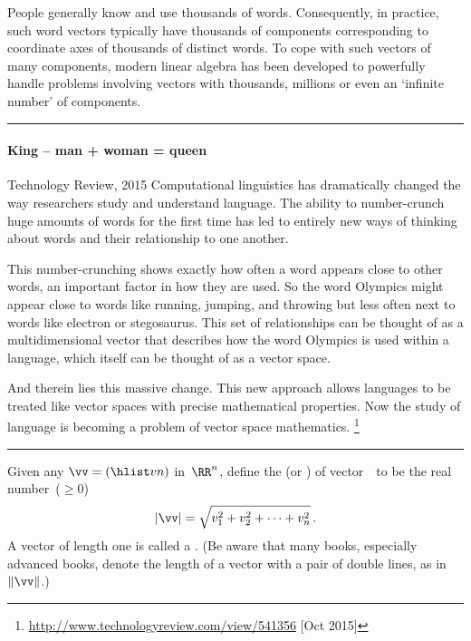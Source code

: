 \begin{example}
People generally know and use thousands of words.
Consequently, in practice, such word vectors typically have thousands of components corresponding to coordinate axes of thousands of distinct words.
To cope with such vectors of many components, modern linear algebra has been developed to powerfully handle problems involving vectors with thousands, millions or even an `infinite number' of components.
\end{example}

\begin{table}
\hrule
\begin{minipage}{\linewidth}
\paragraph{King -- man + woman = queen}
\begin{quoted}{Technology Review, 2015}
Computational linguistics has dramatically changed the way researchers study and understand language. 
The ability to number-crunch huge amounts of words for the first time has led to entirely new ways of thinking about words and their relationship to one another.

This number-crunching shows exactly how often a word appears close to other words, an important factor in how they are used. 
So the word Olympics might appear close to words like running, jumping, and throwing but less often next to words like electron or stegosaurus.  
This set of relationships can be thought of as a multidimensional vector that describes how the word Olympics is used within a language, which itself can be thought of as a vector space.  

And therein lies this massive change. 
This new approach allows languages to be treated like vector spaces with precise mathematical properties. 
Now the study of language is becoming a problem of vector space mathematics.
\footnote{\url{http://www.technologyreview.com/view/541356} [Oct 2015]}
\end{quoted}
\end{minipage}
\hrule
\end{table}







\begin{definition}[Pythagoras] \label{def:veclen}
Given any  \(\vv=(\hlist vn)\) in~\(\RR^n\),
define the  (or ) of vector~\vv\  to be the real number~(\(\geq0\))
\begin{equation*}
|\vv|=\sqrt{v_1^2+v_2^2+\cdots+v_n^2}\,.
\end{equation*}
A vector of length one is called a .
(Be aware that many books, especially advanced books, denote the length of a vector with a pair of double lines, as in~\(\|\vv\|\).)
\end{definition}


